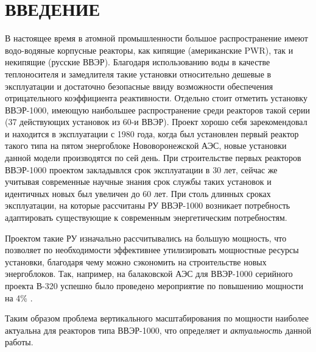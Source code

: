 \section*{ВВЕДЕНИЕ}
В настоящее время в атомной промышленности большое распространение имеют водо-водяные корпусные реакторы, как кипящие (американские PWR), так и некипящие (русские ВВЭР). Благодаря использованию воды в качестве теплоносителя и замедлителя такие установки относительно дешевые в эксплуатации и достаточно безопасные ввиду возможности обеспечения отрицательного коэффициента реактивности. Отдельно стоит отметить установку ВВЭР-1000, имеющую наибольшее распространение среди реакторов такой серии (37 действующих установок из 60-и ВВЭР). Проект хорошо себя зарекомендовал и находится в эксплуатации с 1980 года, когда был установлен первый реактор такого типа на пятом энергоблоке Нововоронежской АЭС, новые установки данной модели производятся по сей день. При строительстве первых реакторов ВВЭР-1000 проектом закладывлся срок эксплуатации в 30 лет, сейчас же учитывая современные научные знания срок службы таких установок и идентичных новых был увеличен до 60 лет. При столь длинных сроках эксплуатации, на которые рассчитаны РУ ВВЭР-1000 возникает потребность адаптировать существующие к современным энергетическим потребностям. 

Проектом такие РУ изначально рассчитывались на большую мощность, что позволяет по необходимости эффективнее утилизировать мощностные ресурсы установки, благодаря чему можно сэкономить на строительстве новых энергоблоков. Так, например, на балаковской АЭС для ВВЭР-1000 серийного проекта В-320 успешно было проведено мероприятие по повышению мощности на 4\% \cite{104балаково}. 

Таким образом проблема вертикального масштабирования по мощности наиболее актуальна для реакторов типа ВВЭР-1000, что определяет и \textit{актуальность} данной работы. 

